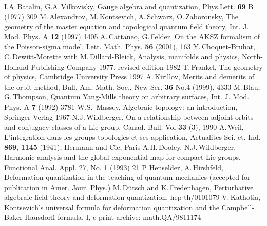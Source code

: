 \documentclass[a4paper,twoside,11pt]{article}
\numberwithin{equation}{section}
\begin{document}
\begin{thebibliography}{235}
%
 I.A.\,Batalin, G.A.\,Vilkovisky, Gauge algebra and quantization, Phys.Lett. {\bf 69} B (1977) 309
%
 M.\,Alexandrov, M.\,Kontsevich, A.\,Schwarz, O.\,Zaboronsky, The geometry of the master equation and topological quantum field theory, 
Int. J. Mod. Phys. A  {\bf 12} (1997) 1405
%
 A.\,Cattaneo, G.\,Felder, On the AKSZ formalism of the Poisson-sigma model, Lett. Math. Phys. {\bf 56} (2001), 163
%
 Y.\,Choquet-Bruhat, C.\,Dewitt-Morette with M.\,Dillard-Bleick, Analysis, manifolds and physics, North-Holland Publishing Company 1977, revised 
edition 1982
%
  T.\,Frankel, The geometry of physics, Cambridge University Press 1997
%
 A.\,Kirillov, Merits and demerits of the orbit method, Bull. Am. Math. Soc., New Ser. {\bf36} No.4 (1999), 4333
%
 M.\,Blau, G.\,Thompson, Quantum Yang-Mills theory on arbitrary surfaces, Int. J. Mod. Phys. 
A {\bf 7} (1992) 3781
%
 W.S.\, Massey,  Algebraic topology: an introduction, Springer-Verlag 1967
%
 N.J.\,Wildberger, On a relationship between adjoint orbits and conjugacy classes of a Lie group, Canad. Bull. Vol {\bf 33} (3), 1990 
%
 A.\,Weil, L'integration dans les groups topologies et ses application, Actualites Sci. et. Ind. {\bf 869}, {\bf 1145} (1941), Hermann and Cie, Paris
%
 A.H.\,Dooley, N.J.\,Wildberger, Harmonic analysis and the global exponential map for compact Lie groups, Functional Anal. Appl. 27, No. 1 (1993) 21   
%
 P.\,Henselder, A.\,Hirshfeld, Deformation quantization in the teaching of quantum mechanics   (accepted for publication in Amer. Jour. Phys.)
%
 M.\,D\"{u}tsch and K.\,Fredenhagen, Perturbative algebraic field theory and deformation quantization, hep-th/0101079
%
 V.\,Kathotia, Kontsevich's universal formula for deformation quantization and the Campbell-Baker-Hausdorff formula, I, e-print archive: math.QA/9811174
%
\end{thebibliography}
\end{document}
